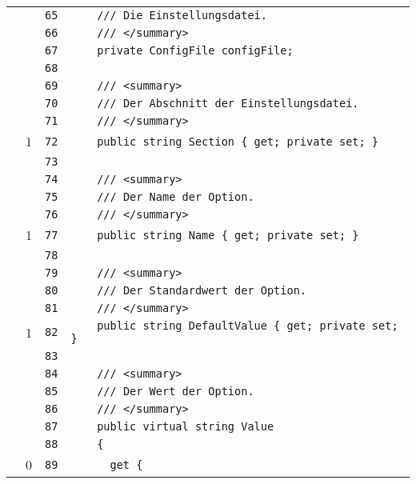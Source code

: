\documentclass[a4paper,10pt]{article}
\begin{document}
\begin{longtable}[l]{lrrl}
\cellcolor{gray} &  & \verb~65~ & \verb~    /// Die Einstellungsdatei.~\\
\cellcolor{gray} &  & \verb~66~ & \verb~    /// </summary>~\\
\cellcolor{gray} &  & \verb~67~ & \verb~    private ConfigFile configFile;~\\
\cellcolor{gray} &  & \verb~68~ & \verb~~\\
\cellcolor{gray} &  & \verb~69~ & \verb~    /// <summary>~\\
\cellcolor{gray} &  & \verb~70~ & \verb~    /// Der Abschnitt der Einstellungsdatei.~\\
\cellcolor{gray} &  & \verb~71~ & \verb~    /// </summary>~\\
\cellcolor{green} & 1 & \verb~72~ & \verb~    public string Section { get; private set; }~\\
\cellcolor{gray} &  & \verb~73~ & \verb~~\\
\cellcolor{gray} &  & \verb~74~ & \verb~    /// <summary>~\\
\cellcolor{gray} &  & \verb~75~ & \verb~    /// Der Name der Option.~\\
\cellcolor{gray} &  & \verb~76~ & \verb~    /// </summary>~\\
\cellcolor{green} & 1 & \verb~77~ & \verb~    public string Name { get; private set; }~\\
\cellcolor{gray} &  & \verb~78~ & \verb~~\\
\cellcolor{gray} &  & \verb~79~ & \verb~    /// <summary>~\\
\cellcolor{gray} &  & \verb~80~ & \verb~    /// Der Standardwert der Option.~\\
\cellcolor{gray} &  & \verb~81~ & \verb~    /// </summary>~\\
\cellcolor{green} & 1 & \verb~82~ & \verb~    public string DefaultValue { get; private set; }~\\
\cellcolor{gray} &  & \verb~83~ & \verb~~\\
\cellcolor{gray} &  & \verb~84~ & \verb~    /// <summary>~\\
\cellcolor{gray} &  & \verb~85~ & \verb~    /// Der Wert der Option.~\\
\cellcolor{gray} &  & \verb~86~ & \verb~    /// </summary>~\\
\cellcolor{gray} &  & \verb~87~ & \verb~    public virtual string Value~\\
\cellcolor{gray} &  & \verb~88~ & \verb~    {~\\
\cellcolor{red} & 0 & \verb~89~ & \verb~      get {~\\

\end{longtable}
\end{document}
